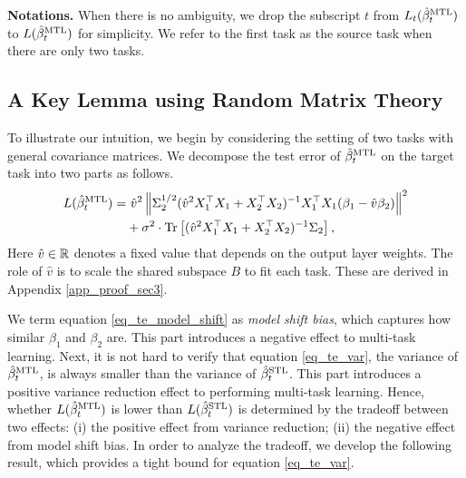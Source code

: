 \textbf{Notations.}
When there is no ambiguity, we drop the subscript $t$ from $L_t(\hat{\beta}_t^{\text{MTL}})$ to $L(\hat{\beta}_t^{\text{MTL}})$ for simplicity.
We refer to the first task as the source task when there are only two tasks.

\subsection{A Key Lemma using Random Matrix Theory}\label{label_rmt}

To illustrate our intuition, we begin by considering the setting of two tasks with general covariance matrices.
We decompose the test error of $\hat{\beta}_{t}^{\text{MTL}}$ on the target task into two parts as follows.
\begin{align}
	L(\hat{\beta}_t^{\text{MTL}}) =& ~ \hat{v}^2 \left\| \Sigma_2^{1/2} (\hat{v}^2 X_1^{\top}X_1 + X_2^{\top}X_2)^{-1}X_1^{\top}X_1 (\beta_1 - \hat{v}\beta_2) \right\|^2 \label{eq_te_model_shift} \\
	&+ \sigma^2\cdot \operatorname{Tr}\left[(\hat{v}^2 X_1^{\top}X_1 + X_2^{\top}X_2)^{-1}\Sigma_2\right], \label{eq_te_var}
\end{align}
Here $\hat{v}\in\mathbb{R}$ denotes a fixed value that depends on the output layer weights.
The role of $\hat{v}$ is to scale the shared subspace $B$ to fit each task.
These are derived in Appendix \ref{app_proof_sec3}.

We term equation \eqref{eq_te_model_shift} as \textit{model shift bias}, which captures how similar $\beta_1$ and $\beta_2$ are.
This part introduces a negative effect to multi-task learning.
Next, it is not hard to verify that equation \eqref{eq_te_var}, the variance of $\hat{\beta}_t^{\text{MTL}}$, is always smaller than the variance of $\hat{\beta}_t^{\text{STL}}$.
This part introduces a positive variance reduction effect to performing multi-task learning.
Hence, whether $L(\hat{\beta}_t^{\text{MTL}})$ is lower than $L(\hat{\beta}_t^{\text{STL}})$ is determined by the tradeoff between two effects:
(i) the positive effect from variance reduction;
(ii) the negative effect from model shift bias.
In order to analyze the tradeoff, we develop the following result, which provides a tight bound for equation \eqref{eq_te_var}.

